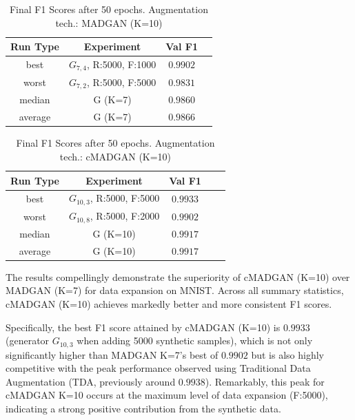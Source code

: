 \begin{table}[H]
	\vspace{-1.5em}
	\centering
	\begin{tabular}{|c|c|c|c|}
		\hline
		Run Type & Experiment & Val F1 \\ \hline
		best & \(G_{7, 4}\), R:5000, F:1000 & $0.9902$\\ \hline
		worst & \(G_{7, 2}\), R:5000, F:5000 & $0.9831$\\ \hline
		median & G (K=7) & $0.9860$\\ \hline
		average & G (K=7) & $0.9866$
		\\ \hline
	\end{tabular}
    \caption{Final F1 Scores after 50 epochs. Augmentation tech.: MADGAN (K=10)}
        \label{tab:res_expansion_mnist_cmadgan_vs_madgan__madgan}
\end{table}
\begin{table}[H]
	\centering
	\vspace{-1.5em}
	\begin{tabular}{|c|c|c|c|c|}
		\hline
		Run Type & Experiment & Val F1 \\ \hline
		best & \(G_{10, 3}\), R:5000, F:5000 & $0.9933$\\ \hline
		worst & \(G_{10, 8}\), R:5000, F:2000 & $0.9902$\\ \hline
		median & G (K=10) & $0.9917$\\ \hline
		average & G (K=10) & $0.9917$
		\\ \hline
	\end{tabular}
    \caption{Final F1 Scores after 50 epochs. Augmentation tech.: cMADGAN (K=10)}
        \label{tab:res_expansion_mnist_cmadgan_vs_madgan__cmadgan}
\end{table}

The results compellingly demonstrate the superiority of cMADGAN (K=10) over MADGAN (K=7) for data expansion on MNIST. Across all summary statistics, cMADGAN (K=10) achieves markedly better and more consistent F1 scores.

Specifically, the best F1 score attained by cMADGAN (K=10) is $0.9933$ (generator \(G_{10,3}\) when adding 5000 synthetic samples), which is not only significantly higher than MADGAN K=7's best of $0.9902$ but is also highly competitive with the peak performance observed using Traditional Data Augmentation (TDA, previously around $0.9938$). Remarkably, this peak for cMADGAN K=10 occurs at the maximum level of data expansion (F:5000), indicating a strong positive contribution from the synthetic data.

